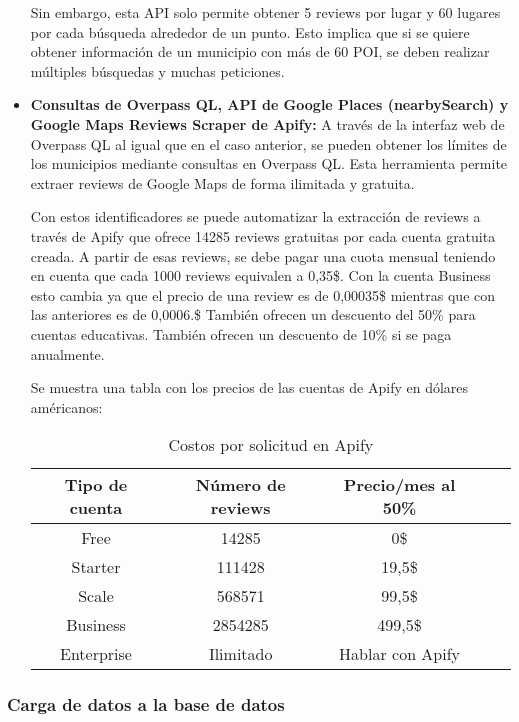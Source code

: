 \begin{itemize}
    Sin embargo, esta API solo permite obtener 5 reviews por lugar y 60 lugares por cada búsqueda alrededor de un punto. Esto implica que si se quiere obtener información de un municipio con más de 60 POI, se deben realizar múltiples búsquedas y muchas peticiones.
    \item \textbf{Consultas de Overpass QL, API de Google Places (nearbySearch) y Google Maps Reviews Scraper de Apify:} A través de la interfaz web de Overpass QL
    al igual que en el caso anterior, se pueden obtener los límites de los municipios mediante consultas en Overpass QL.
    Esta herramienta permite extraer reviews de Google Maps de forma ilimitada y gratuita.

    Con estos identificadores se puede automatizar la extracción de reviews a través de Apify que ofrece 14285 reviews gratuitas por cada cuenta gratuita creada.
    A partir de esas reviews, se debe pagar una cuota mensual teniendo en cuenta que cada 1000 reviews equivalen a 0,35\$.
    Con la cuenta Business esto cambia ya que el precio de una review es de 0,00035\$ mientras que con las anteriores es de 0,0006.\$
    También ofrecen un descuento del 50\% para cuentas educativas\cite{apify:universities}. También ofrecen un descuento de 10\% si se paga anualmente.

    Se muestra una tabla con los precios de las cuentas de Apify\cite{apify:pricing} en dólares américanos:
    \begin{table}[h!]
        \centering
        \begin{tabular}{|c|c|c|c|c|}
            \hline
            \textbf{Tipo de cuenta} & \textbf{Número de reviews} & \textbf{Precio/mes al 50\%} \\
            \hline
            Free & 14285 & 0\$ \\
            Starter & 111428 & 19,5\$ \\
            Scale & 568571 & 99,5\$ \\
            Business & 2854285 & 499,5\$ \\
            Enterprise & Ilimitado & Hablar con Apify \\
            \hline
        \end{tabular}
        \caption{Costos por solicitud en Apify}
    \end{table}
\end{itemize}

\subsubsection{Carga de datos a la base de datos}

